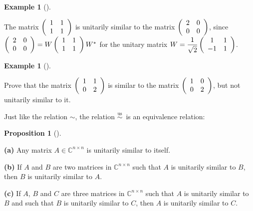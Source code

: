 \documentclass[numbers=enddot,12pt,final,onecolumn,notitlepage]{scrartcl}%
\numberwithin{exer}{subsection}
\theoremstyle{definition}
\newtheorem{prop}[theo]{Proposition}
\newenvironment{proposition}[1][]
{\begin{prop}[#1]\begin{leftbar}}
{\end{leftbar}\end{prop}}
\newtheorem{exam}[theo]{Example}
\newenvironment{example}[1][]
{\begin{exam}[#1]\begin{leftbar}}
{\end{leftbar}\end{exam}}
\begin{document}
\begin{example}
The matrix $\left(
\begin{array}
[c]{cc}%
1 & 1\\
1 & 1
\end{array}
\right)  $ is unitarily similar to the matrix $\left(
\begin{array}
[c]{cc}%
2 & 0\\
0 & 0
\end{array}
\right)  $, since $\left(
\begin{array}
[c]{cc}%
2 & 0\\
0 & 0
\end{array}
\right)  =W\left(
\begin{array}
[c]{cc}%
1 & 1\\
1 & 1
\end{array}
\right)  W^{\ast}$ for the unitary matrix $W=\dfrac{1}{\sqrt{2}}\left(
\begin{array}
[c]{cc}%
1 & 1\\
-1 & 1
\end{array}
\right)  $.
\end{example}

\begin{example}
\label{exe.schurtri.unisim.two2x2} Prove that the matrix $\left(
\begin{array}
[c]{cc}%
1 & 1\\
0 & 2
\end{array}
\right)  $ is similar to the matrix $\left(
\begin{array}
[c]{cc}%
1 & 0\\
0 & 2
\end{array}
\right)  $, but not unitarily similar to it.
\end{example}

Just like the relation $\sim$, the relation $\overset{\operatorname*{us}%
}{\sim}$\ is an equivalence relation:

\begin{proposition}
\label{prop.schurtri.unisim.eqrel}\textbf{(a)} Any matrix $A\in\mathbb{C}%
^{n\times n}$ is unitarily similar to itself. \medskip

\textbf{(b)} If $A$ and $B$ are two matrices in $\mathbb{C}^{n\times n}$ such
that $A$ is unitarily similar to $B$, then $B$ is unitarily similar to $A$.
\medskip

\textbf{(c)} If $A$, $B$ and $C$ are three matrices in $\mathbb{C}^{n\times
n}$ such that $A$ is unitarily similar to $B$ and such that $B$ is unitarily
similar to $C$, then $A$ is unitarily similar to $C$.
\end{proposition}
\end{document}
